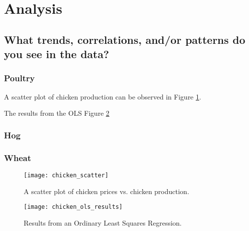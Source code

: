 \section{Analysis}

\subsection{What trends, correlations, and/or patterns do you see in the data?}

\subsubsection{Poultry}

A scatter plot of chicken production can be observed in Figure \ref{fig:chicken_scatter}.

The results from the OLS Figure \ref{fig:chicken_ols}

\subsubsection{Hog}

\subsubsection{Wheat}



\begin{figure}
    \texttt{[image: chicken\_scatter]}
    \caption{A scatter plot of chicken prices vs. chicken production.}
    \label{fig:chicken_scatter}
\end{figure}



\begin{figure}
    \texttt{[image: chicken\_ols\_results]}
    \caption{Results from an Ordinary Least Squares Regression.}
    \label{fig:chicken_ols}
\end{figure}